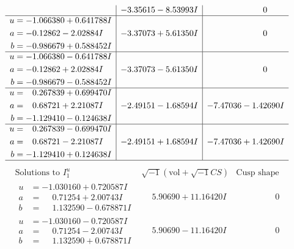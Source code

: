 \documentclass[1p]{elsarticle_modified}
\theoremstyle{definition}
\newcommand{\I}{\sqrt{-1}}
\begin{document}
$$\begin{array}{c|c|c}
 & -3.35615 - 8.53993 I & \phantom{-0.000000 } 0 \\ \hline\begin{aligned}
u &= -1.066380 + 0.641788 I \\
a &= -0.12862 - 2.02884 I \\
b &= -0.986679 + 0.588452 I\end{aligned}
 & -3.37073 + 5.61350 I & \phantom{-0.000000 } 0 \\ \hline\begin{aligned}
u &= -1.066380 - 0.641788 I \\
a &= -0.12862 + 2.02884 I \\
b &= -0.986679 - 0.588452 I\end{aligned}
 & -3.37073 - 5.61350 I & \phantom{-0.000000 } 0 \\ \hline\begin{aligned}
u &= \phantom{-}0.267839 + 0.699470 I \\
a &= \phantom{-}0.68721 + 2.21087 I \\
b &= -1.129410 - 0.124638 I\end{aligned}
 & -2.49151 - 1.68594 I & -7.47036 - 1.42690 I \\ \hline\begin{aligned}
u &= \phantom{-}0.267839 - 0.699470 I \\
a &= \phantom{-}0.68721 - 2.21087 I \\
b &= -1.129410 + 0.124638 I\end{aligned}
 & -2.49151 + 1.68594 I & -7.47036 + 1.42690 I\\
 \hline 
 \end{array}$$\newpage$$\begin{array}{c|c|c}  
\text{Solutions to }I^u_{1}& \I (\text{vol} + \sqrt{-1}CS) & \text{Cusp shape}\\
 \hline 
\begin{aligned}
u &= -1.030160 + 0.720587 I \\
a &= \phantom{-}0.71254 + 2.00743 I \\
b &= \phantom{-}1.132590 - 0.678871 I\end{aligned}
 & \phantom{-}5.90690 + 11.16420 I & \phantom{-0.000000 } 0 \\ \hline\begin{aligned}
u &= -1.030160 - 0.720587 I \\
a &= \phantom{-}0.71254 - 2.00743 I \\
b &= \phantom{-}1.132590 + 0.678871 I\end{aligned}
 & \phantom{-}5.90690 - 11.16420 I & \phantom{-0.000000 } 0 \\ \hline\begin{aligned}

\end{aligned}
\end{array}$$
\end{document}
